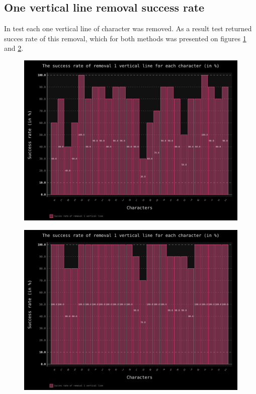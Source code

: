\documentclass[a4paper]{article}
\begin{document}
\clearpage
\subsection{One vertical line removal success rate}
In test each one vertical line of character was removed. As a result test returned succes rate of this removal, which for both methods was presented on figures \ref{ver_line_trans} and \ref{ver_line_clas}.
\begin{figure}[ht]
	\centering
	\includegraphics[scale=0.7,keepaspectratio=true]{Charts/VerLineTestPlanResultsChart_NormalTester.png}	
	\caption{}
	\label{ver_line_trans}
\end{figure}

\begin{figure}[t]
	\centering
	\includegraphics[scale=0.7,keepaspectratio=true]{Charts/VerLineTestPlanResultsChart_ClasifierTester.png}	
	\caption{}
	\label{ver_line_clas}
\end{figure}
\end{document}
